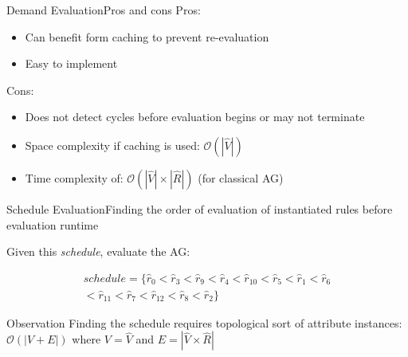 
\begin{frame}{Demand Evaluation}{Pros and cons}
Pros:
\begin{itemize}
    \item Can benefit form \alert{caching to prevent re-evaluation}
    \item Easy to implement
\end{itemize}

Cons:
\begin{itemize}
    \item Does not detect cycles before evaluation begins or \alert{may not terminate}
    \item Space complexity if \alert{caching} is used: $\mathcal{O}(|\hat{V}|)$
    \item Time complexity of: $\mathcal{O}(| \hat{V} | \times | \hat{R} |)$ (for classical AG)
\end{itemize}
\end{frame}



\begin{frame}{Schedule Evaluation}{Finding the order of evaluation of instantiated rules before evaluation runtime}

Given this \emph{schedule}, evaluate the AG:

\begin{equation}
\begin{split}
\mathit{schedule} = \Big \{\hat{r}_0 < \hat{r}_3 < \hat{r}_9 < \hat{r}_4 < \hat{r}_{10} < \hat{r}_5 < \hat{r}_1 < \hat{r}_6 \\
< \hat{r}_{11} < \hat{r}_7 < \hat{r}_{12} < \hat{r}_8 < \hat{r}_2 \Big \}    
\end{split}
\end{equation}

\begin{alertblock}{Observation}
Finding the schedule requires topological sort of attribute instances: $\mathcal{O}(| V +  E|)$ where $V = \hat{V}$ and $E = |\hat{V}  \times  \hat{R}|$
\end{alertblock}
\end{frame}

